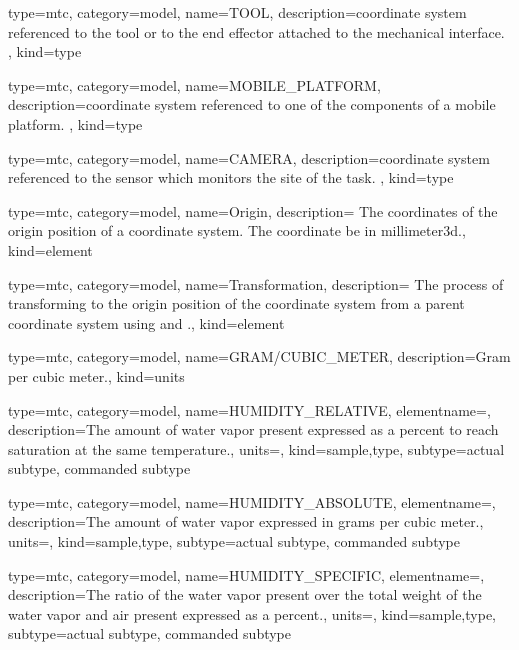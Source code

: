 {
  type=mtc,
  category=model,
  name={TOOL},
  description={coordinate system referenced to the tool or to the end effector attached to the mechanical interface. },
  kind={type}
}


{
  type=mtc,
  category=model,
  name={MOBILE\_PLATFORM},
  description={coordinate system referenced to one of the components of a mobile platform. },
  kind={type}
}


{
  type=mtc,
  category=model,
  name={CAMERA},
  description={coordinate system referenced to the sensor which monitors the site of the task. },
  kind={type}
}


{
  type=mtc,
  category=model,
  name={Origin},
  description={ The coordinates of the origin position of a coordinate system. The coordinate \MUST be in \gls{millimeter3d}.},
  kind={element}
}


{
  type=mtc,
  category=model,
  name={Transformation},
  description={ The process of transforming to the origin position of the coordinate system from a parent coordinate system using  and .},
  kind={element}
}


{
  type=mtc,
  category=model,
  name={GRAM/CUBIC\_METER},
  description={Gram per cubic meter.},
  kind={units}
}


{
  type=mtc,
  category=model,
  name={HUMIDITY\_RELATIVE},
  elementname=,
  description={The amount of water vapor present expressed as a percent to reach saturation at the same temperature.},
  units=,
  kind={sample,type},
  subtype={\gls{actual subtype}, \gls{commanded subtype}}
}


{
  type=mtc,
  category=model,
  name={HUMIDITY\_ABSOLUTE},
  elementname=,
  description={The amount of water vapor expressed in grams per cubic meter.},
  units=,
  kind={sample,type},
  subtype={\gls{actual subtype}, \gls{commanded subtype}}
}


{
  type=mtc,
  category=model,
  name={HUMIDITY\_SPECIFIC},
  elementname=,
  description={The ratio of the water vapor present over the total weight of the water vapor and air present expressed as a percent.},
  units=,
  kind={sample,type},
  subtype={\gls{actual subtype}, \gls{commanded subtype}}
}

